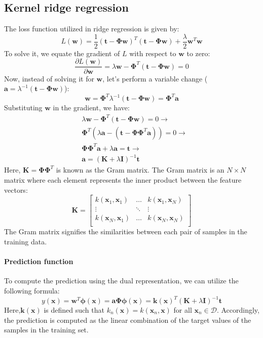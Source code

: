 \subsection{Kernel ridge regression}
The loss function utilized in ridge regression is given by:
\[L(\textbf{w})=\dfrac{1}{2}\left(\textbf{t}-\boldsymbol{\Phi}\textbf{w}\right)^T\left(\textbf{t}-\boldsymbol{\Phi}\textbf{w}\right)+\dfrac{\lambda}{2}\textbf{w}^T\textbf{w}\]
To solve it, we equate the gradient of $L$ with respect to $\textbf{w}$ to zero:
\[\dfrac{\partial L(\textbf{w})}{\partial \textbf{w}}=\lambda\textbf{w}-\boldsymbol{\Phi}^T(\textbf{t}-\boldsymbol{\Phi}\textbf{w})=0\]
Now, instead of solving it for $\textbf{w}$, let's perform a variable change ($\textbf{a}=\lambda^{-1}(\textbf{t}-\boldsymbol{\Phi}\textbf{w})$):
\[\textbf{w}=\boldsymbol{\Phi}^T\lambda^{-1}(\textbf{t}-\boldsymbol{\Phi}\textbf{w})=\boldsymbol{\Phi}^T\textbf{a}\]
Substituting $\textbf{w}$ in the gradient, we have:
\begin{align*}
    &\lambda\textbf{w}-\boldsymbol{\Phi}^T(\textbf{t}-\boldsymbol{\Phi}\textbf{w})=0 \rightarrow \\
    &\boldsymbol{\Phi}^T\left(\lambda \textbf{a} -\left( \textbf{t}-\boldsymbol{\Phi}\boldsymbol{\Phi}^T\textbf{a}\right) \right)=0 \rightarrow \\
    &\boldsymbol{\Phi}\boldsymbol{\Phi}^T\textbf{a} + \lambda \textbf{a} =\textbf{t} \rightarrow \\
    &\textbf{a} = \left(\textbf{K}+\lambda \textbf{I}\right)^{-1}\textbf{t}
\end{align*}
Here, $\textbf{K}=\boldsymbol{\Phi}\boldsymbol{\Phi}^T$ is known as the Gram matrix.
The Gram matrix is an $N\times N$ matrix where each element represents the inner product between the feature vectors:
\[\textbf{K}=\begin{bmatrix}
    k(\textbf{x}_1,\textbf{x}_1)    & \dots     & k(\textbf{x}_1,\textbf{x}_N)  \\
    \vdots                          & \ddots    & \vdots                        \\
    k(\textbf{x}_N,\textbf{x}_1)    & \dots     & k(\textbf{x}_N,\textbf{x}_N)  \\
\end{bmatrix}\]
The Gram matrix signifies the similarities between each pair of samples in the training data.

\paragraph*{Prediction function}
To compute the prediction using the dual representation, we can utilize the following formula:
\[y(\textbf{x})=\textbf{w}^T\boldsymbol{\phi}(\textbf{x})=\textbf{a}\boldsymbol{\Phi}\boldsymbol{\phi}(\textbf{x})=\textbf{k}(\textbf{x})^T(\textbf{K}+\lambda\textbf{I})^{-1}\textbf{t}\]
Here,$\textbf{k}(\textbf{x})$ is defined such that $k_n(\textbf{x})=k(\textbf{x}_n,\textbf{x})$ for all $\textbf{x}_n\in\mathcal{D}$. 
Accordingly, the prediction is computed as the linear combination of the target values of the samples in the training set.

